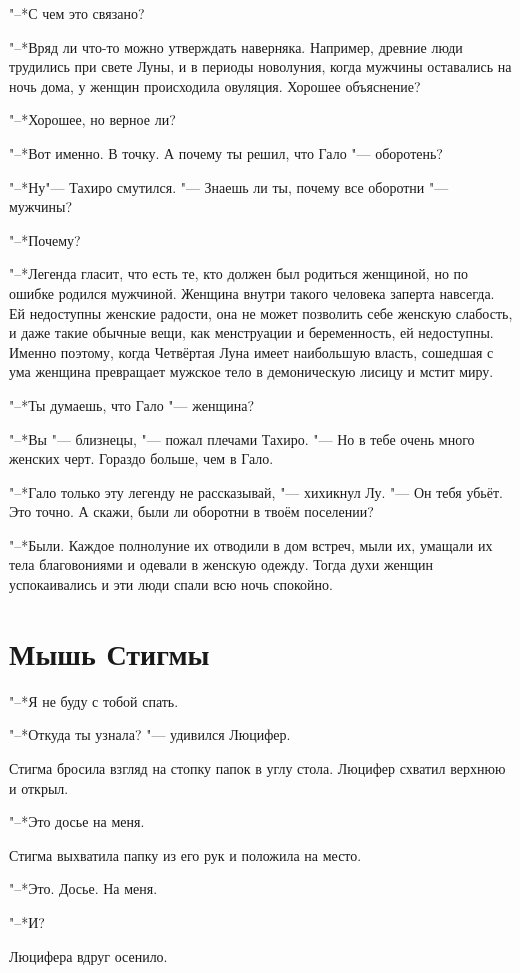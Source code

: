 "--*С чем это связано?

"--*Вряд ли что-то можно утверждать наверняка.
Например, древние люди трудились при свете Луны, и в периоды новолуния, когда мужчины оставались на ночь дома, у женщин происходила овуляция.
Хорошее объяснение?

"--*Хорошее, но верное ли?

"--*Вот именно.
В точку.
А почему ты решил, что Гало "--- оборотень?

"--*Ну\ldotst "--- Тахиро смутился.
"--- Знаешь ли ты, почему все оборотни "--- мужчины?

"--*Почему?

"--*Легенда гласит, что есть те, кто должен был родиться женщиной, но по ошибке родился мужчиной.
Женщина внутри такого человека заперта навсегда.
Ей недоступны женские радости, она не может позволить себе женскую слабость, и даже такие обычные вещи, как менструации и беременность, ей недоступны.
Именно поэтому, когда Четвёртая Луна имеет наибольшую власть, сошедшая с ума женщина превращает мужское тело в демоническую лисицу и мстит миру.

"--*Ты думаешь, что Гало "--- женщина?

"--*Вы "--- близнецы, "--- пожал плечами Тахиро.
"--- Но в тебе очень много женских черт.
Гораздо больше, чем в Гало.

"--*Гало только эту легенду не рассказывай, "--- хихикнул Лу.
"--- Он тебя убьёт.
Это точно.
А скажи, были ли оборотни в твоём поселении?

"--*Были.
Каждое полнолуние их отводили в дом встреч, мыли их, умащали их тела благовониями и одевали в женскую одежду.
Тогда духи женщин успокаивались и эти люди спали всю ночь спокойно.

\section{Мышь Стигмы}

"--*Я не буду с тобой спать.

"--*Откуда ты узнала? "--- удивился Люцифер.

Стигма бросила взгляд на стопку папок в углу стола.
Люцифер схватил верхнюю и открыл.

"--*Это досье на меня.

Стигма выхватила папку из его рук и положила на место.

"--*Это. Досье. На меня.

"--*И?

Люцифера вдруг осенило.

